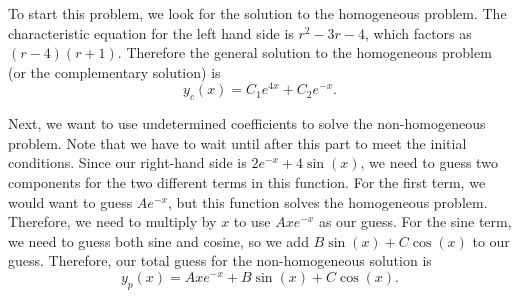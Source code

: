 \documentclass{ximera}
\begin{document}
\begin{exampleSol}
    To start this problem, we look for the solution to the homogeneous problem. The characteristic equation for the left hand side is $r^2 - 3r - 4$, which factors as $(r-4)(r+1)$. Therefore the general solution to the homogeneous problem (or the complementary solution) is 
    \begin{equation*}
        y_c(x) = C_1e^{4x} + C_2e^{-x} .
    \end{equation*} 
    
    Next, we want to use undetermined coefficients to solve the non-homogeneous problem. Note that we have to wait until after this part to meet the initial conditions. Since our right-hand side is $2e^{-x} + 4 \sin(x)$, we need to guess two components for the two different terms in this function. For the first term, we would want to guess $Ae^{-x}$, but this function solves the homogeneous problem. Therefore, we need to multiply by $x$ to use $Axe^{-x}$ as our guess. For the sine term, we need to guess both sine and cosine, so we add $B\sin(x) + C\cos(x)$ to our guess. Therefore, our total guess for the non-homogeneous solution is
    \begin{equation*}
        y_p(x) = Axe^{-x} + B\sin(x) + C\cos(x).
    \end{equation*}
    

\end{exampleSol}
\end{document}
